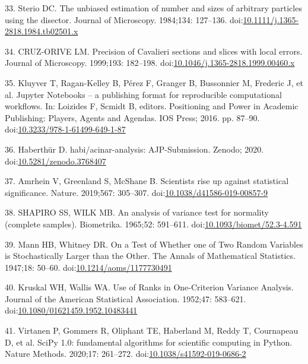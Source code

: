\documentclass[
  american,
]{article}
\newenvironment{cslreferences}%
  {}%
  {\par}
\begin{document}
\begin{cslreferences}
\leavevmode\hypertarget{ref-FJ9FoB4m}{}%
33. Sterio DC. The unbiased estimation of number and sizes of arbitrary particles using the disector. Journal of Microscopy. 1984;134: 127--136. doi:\href{https://doi.org/10.1111/j.1365-2818.1984.tb02501.x}{10.1111/j.1365-2818.1984.tb02501.x}

\leavevmode\hypertarget{ref-FE9HLB4f}{}%
34. CRUZ-ORIVE LM. Precision of Cavalieri sections and slices with local errors. Journal of Microscopy. 1999;193: 182--198. doi:\href{https://doi.org/10.1046/j.1365-2818.1999.00460.x}{10.1046/j.1365-2818.1999.00460.x}

\leavevmode\hypertarget{ref-pQ6Wbz73}{}%
35. Kluyver T, Ragan-Kelley B, Pérez F, Granger B, Bussonnier M, Frederic J, et al. Jupyter Notebooks -- a publishing format for reproducible computational workflows. In: Loizides F, Scmidt B, editors. Positioning and Power in Academic Publishing: Players, Agents and Agendas. IOS Press; 2016. pp. 87--90. doi:\href{https://doi.org/10.3233/978-1-61499-649-1-87}{10.3233/978-1-61499-649-1-87}

\leavevmode\hypertarget{ref-V87xbt0b}{}%
36. Haberthür D. habi/acinar-analysis: AJP-Submission. Zenodo; 2020. doi:\href{https://doi.org/10.5281/zenodo.3768407}{10.5281/zenodo.3768407}

\leavevmode\hypertarget{ref-o21zxPIu}{}%
37. Amrhein V, Greenland S, McShane B. Scientists rise up against statistical significance. Nature. 2019;567: 305--307. doi:\href{https://doi.org/10.1038/d41586-019-00857-9}{10.1038/d41586-019-00857-9}

\leavevmode\hypertarget{ref-IkHrgIj3}{}%
38. SHAPIRO SS, WILK MB. An analysis of variance test for normality (complete samples). Biometrika. 1965;52: 591--611. doi:\href{https://doi.org/10.1093/biomet/52.3-4.591}{10.1093/biomet/52.3-4.591}

\leavevmode\hypertarget{ref-MyzxBJ57}{}%
39. Mann HB, Whitney DR. On a Test of Whether one of Two Random Variables is Stochastically Larger than the Other. The Annals of Mathematical Statistics. 1947;18: 50--60. doi:\href{https://doi.org/10.1214/aoms/1177730491}{10.1214/aoms/1177730491}

\leavevmode\hypertarget{ref-ON1Bppkk}{}%
40. Kruskal WH, Wallis WA. Use of Ranks in One-Criterion Variance Analysis. Journal of the American Statistical Association. 1952;47: 583--621. doi:\href{https://doi.org/10.1080/01621459.1952.10483441}{10.1080/01621459.1952.10483441}

\leavevmode\hypertarget{ref-8Miti2Gz}{}%
41. Virtanen P, Gommers R, Oliphant TE, Haberland M, Reddy T, Cournapeau D, et al. SciPy 1.0: fundamental algorithms for scientific computing in Python. Nature Methods. 2020;17: 261--272. doi:\href{https://doi.org/10.1038/s41592-019-0686-2}{10.1038/s41592-019-0686-2}


\end{cslreferences}
\end{document}
